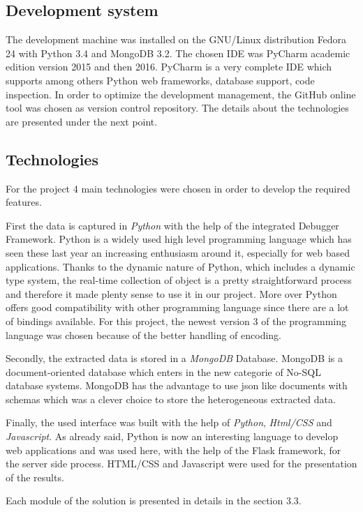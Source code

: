 \subsection{Development system}
The development machine was installed on the GNU/Linux distribution Fedora 24 with Python 3.4 and MongoDB 3.2. The chosen IDE was PyCharm academic edition version 2015 and then 2016. PyCharm is a very complete IDE which supports among others Python web frameworks, database support, code inspection. In order to optimize the development management, the GitHub online tool was chosen as version control repository. The details about the technologies are presented under the next point.

\subsection{Technologies}
For the project 4 main technologies were chosen in order to develop the required features. 

First the data is captured in \textit{Python} with the help of the integrated Debugger Framework. Python is a widely used high level programming language which has seen these last year an increasing enthusiasm around it, especially for web based applications. Thanks to the dynamic nature of Python, which includes a dynamic type system, the real-time collection of object is a pretty straightforward process and therefore it made plenty sense to use it in our project. More over Python offers good compatibility with other programming language since there are a lot of bindings available. For this project, the newest version 3 of the programming language was chosen because of the better handling of encoding.

Secondly, the extracted data is stored in a \textit{MongoDB} Database. MongoDB is a document-oriented database which enters in the new categorie of No-SQL database systems. MongoDB has the advantage to use \gls{json} like documents with schemas which was a clever choice to store the heterogeneous extracted data.

Finally, the used interface was built with the help of \textit{Python}, \textit{Html/CSS} and \textit{Javascript}. As already said, Python is now an interesting language to develop web applications and was used here, with the help of the Flask framework, for the server side process. HTML/CSS and Javascript were used for the presentation of the results.

Each module of the solution is presented in details in the section 3.3. 

